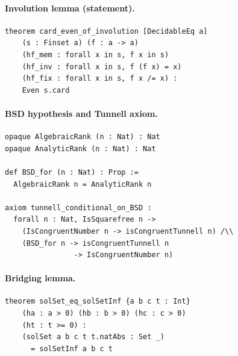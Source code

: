 \documentclass[11pt,a4paper]{article}
\theoremstyle{definition}
\begin{document}
\paragraph{Involution lemma (statement).}
\begin{lstlisting}
theorem card_even_of_involution [DecidableEq a]
    (s : Finset a) (f : a -> a)
    (hf_mem : forall x in s, f x in s)
    (hf_inv : forall x in s, f (f x) = x)
    (hf_fix : forall x in s, f x /= x) :
    Even s.card
\end{lstlisting}

\paragraph{BSD hypothesis and Tunnell axiom.}
\begin{lstlisting}
opaque AlgebraicRank (n : Nat) : Nat
opaque AnalyticRank (n : Nat) : Nat

def BSD_for (n : Nat) : Prop :=
  AlgebraicRank n = AnalyticRank n

axiom tunnell_conditional_on_BSD :
  forall n : Nat, IsSquarefree n ->
    (IsCongruentNumber n -> isCongruentTunnell n) /\\
    (BSD_for n -> isCongruentTunnell n
                -> IsCongruentNumber n)
\end{lstlisting}

\paragraph{Bridging lemma.}
\begin{lstlisting}
theorem solSet_eq_solSetInf {a b c t : Int}
    (ha : a > 0) (hb : b > 0) (hc : c > 0)
    (ht : t >= 0) :
    (solSet a b c t t.natAbs : Set _)
      = solSetInf a b c t
\end{lstlisting}
\end{document}
